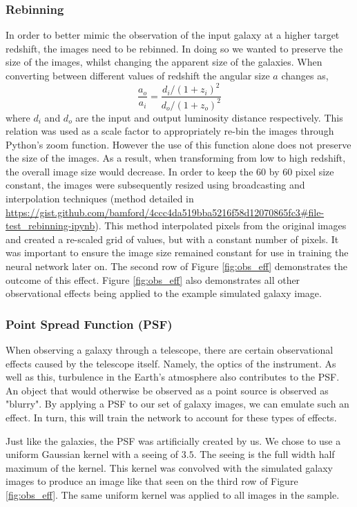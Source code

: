 \documentclass[fleqn,usenatbib]{mnras}
\begin{document}
\subsubsection{Rebinning}
\label{sec:rebinning} 
In order to better mimic the observation of the input galaxy at a higher target redshift, the images need to be rebinned. In doing so we wanted to preserve the size of the images, whilst changing the apparent size of the galaxies. When converting between different values of redshift the angular size $a$ changes as,
\begin{equation}
\label{ang_size}
\frac{a_o}{a_i} = \frac{d_i / (1 + z_i)^2}{d_o / (1 + z_o)^2}
\end{equation}
where $d_i$ and $d_o$ are the input and output luminosity distance respectively. This relation was used as a scale factor to appropriately re-bin the images through Python's zoom function. However the use of this function alone does not preserve the size of the images. As a result, when transforming from low to high redshift, the overall image size would decrease. In order to keep the 60 by 60 pixel size constant, the images were subsequently resized using broadcasting and interpolation techniques (method detailed in \url{https://gist.github.com/bamford/4ccc4da519bba5216f58d12070865fc3#file-test_rebinning-ipynb}). This method interpolated pixels from the original images and created a re-scaled grid of values, but with a constant number of pixels. It was important to ensure the image size remained constant for use in training the neural network later on. The second row of Figure \ref{fig:obs_eff} demonstrates the outcome of this effect. Figure \ref{fig:obs_eff} also demonstrates all other observational effects being applied to the example simulated galaxy image.

\subsubsection{Point Spread Function (PSF)}
\label{sec:psf}
When observing a galaxy through a telescope, there are certain observational effects caused by the telescope itself. Namely, the optics of the instrument. As well as this, turbulence in the Earth's atmosphere also contributes to the PSF. An object that would otherwise be observed as a point source is observed as "blurry". By applying a PSF to our set of galaxy images, we can emulate such an effect. In turn, this will train the network to account for these types of effects. 

Just like the galaxies, the PSF was artificially created by us. We chose to use a uniform Gaussian kernel with a seeing of $3.5$. The seeing is the full width half maximum of the kernel. This kernel was convolved with the simulated galaxy images to produce an image like that seen on the third row of Figure \ref{fig:obs_eff}. The same uniform kernel was applied to all images in the sample.
\end{document}
